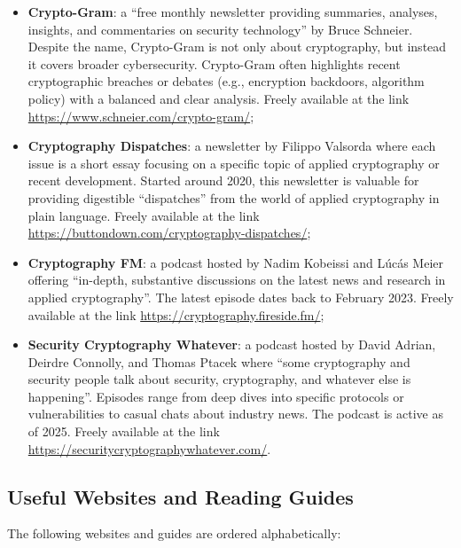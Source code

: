 \begin{itemize}

	\item \textbf{Crypto-Gram}: a ``free monthly newsletter providing summaries, analyses, insights, and commentaries on security technology'' by Bruce Schneier. Despite the name, Crypto-Gram is not only about cryptography, but instead it covers broader cybersecurity. Crypto-Gram often highlights recent cryptographic breaches or debates (e.g., encryption backdoors, algorithm policy) with a balanced and clear analysis. Freely available at the link \url{https://www.schneier.com/crypto-gram/};
	
	\item \textbf{Cryptography Dispatches}: a newsletter by Filippo Valsorda where each issue is a short essay focusing on a specific topic of applied cryptography or recent development. Started around 2020, this newsletter is valuable for providing digestible ``dispatches'' from the world of applied cryptography in plain language. Freely available at the link \url{https://buttondown.com/cryptography-dispatches/};

	\item \textbf{Cryptography FM}: a podcast hosted by Nadim Kobeissi and Lúcás Meier offering ``in-depth, substantive discussions on the latest news and research in applied cryptography''. The latest episode dates back to February 2023. Freely available at the link \url{https://cryptography.fireside.fm/};

	\item \textbf{Security Cryptography Whatever}: a podcast hosted by David Adrian, Deirdre Connolly, and Thomas Ptacek where ``some cryptography and security people talk about security, cryptography, and whatever else is happening''. Episodes range from deep dives into specific protocols or vulnerabilities to casual chats about industry news. The podcast is active as of 2025. Freely available at the link \url{https://securitycryptographywhatever.com/}.
	
\end{itemize}


\subsection{Useful Websites and Reading Guides}\label{sec:appendix:further_resources:web}

The following websites and guides are ordered alphabetically:

